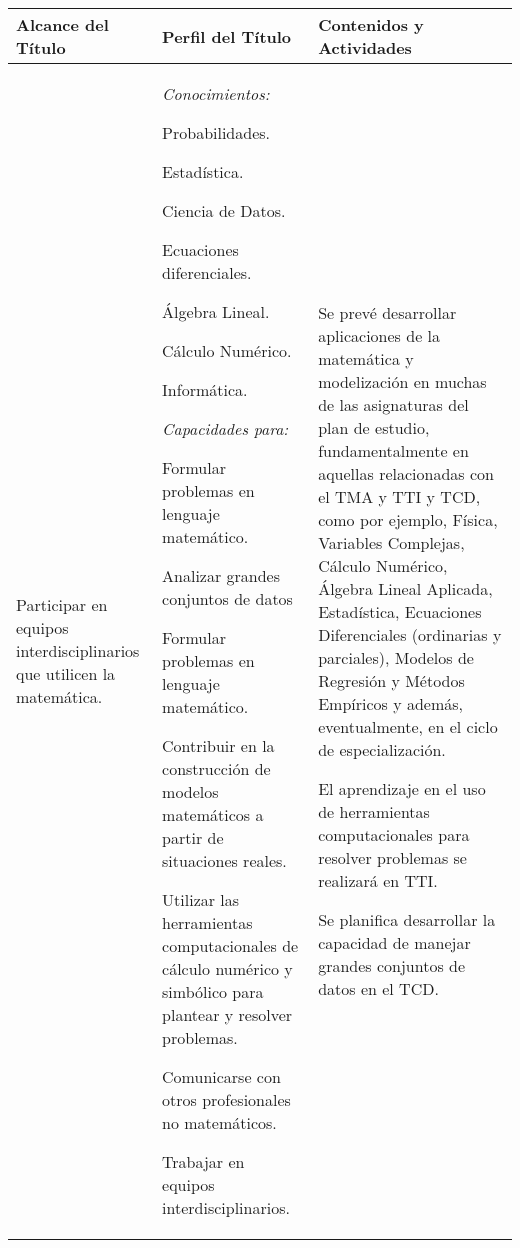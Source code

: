 \documentclass[a4paper, 12pt]{article}
\begin{document}
\begin{center}

\begin{xltabular}{1.0\textwidth}{|>{\raggedright\arraybackslash}X |
>{\raggedright\arraybackslash}X |
>{\raggedright\arraybackslash}X |
}\hline
  Alcance del Título
  & Perfil del Título
  & Contenidos y Actividades \\ \hline
Participar en equipos interdisciplinarios que utilicen la matemática.
  & \emph{Conocimientos:} 
  
 
 Probabilidades.
    
   Estadística.
   
   Ciencia de Datos.
   
   Ecuaciones diferenciales.
   
   Álgebra Lineal. 
   
   Cálculo Numérico. 
   
   Informática.
 
  
  \emph{Capacidades para:} 
    
 
   Formular problemas en lenguaje matemático.
   
    Analizar grandes conjuntos de datos
    
   Formular problemas en lenguaje matemático.
   
   Contribuir en la construcción de modelos matemáticos a partir de situaciones reales.
   
    Utilizar las herramientas computacionales de cálculo numérico y simbólico para plantear y resolver problemas.
    
   Comunicarse con otros profesionales no matemáticos.
   
   Trabajar en equipos interdisciplinarios.
 
  
  
  &

  
 Se prevé desarrollar aplicaciones de la matemática y modelización en muchas de las asignaturas del plan de estudio, fundamentalmente en aquellas relacionadas con el TMA y TTI y TCD, como por ejemplo,  Física, Variables Complejas, Cálculo Numérico, Álgebra Lineal Aplicada, Estadística, Ecuaciones Diferenciales (ordinarias y parciales), Modelos de Regresión y Métodos Empíricos y además, eventualmente, en el ciclo de especialización.
  
  El aprendizaje en el uso de herramientas computacionales para resolver problemas se realizará en  TTI.
  
  Se planifica desarrollar la capacidad de manejar grandes conjuntos de datos en el TCD.



\end{xltabular}
\end{center}
\end{document}
